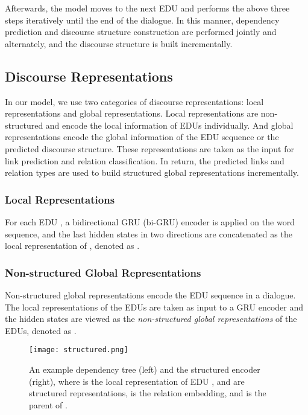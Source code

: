 \documentclass[letterpaper]{article} \usepackage{aaai19}  \usepackage{times}  \usepackage{helvet}  \usepackage{courier}  \usepackage{url}  \usepackage{graphicx}  \usepackage{amssymb}
\begin{document}
Afterwards, the model moves to the next EDU  and performs the above three steps iteratively until the end of the dialogue. In this manner, dependency prediction and discourse structure construction are performed jointly and alternately, and the discourse structure is built incrementally.

\subsection{Discourse Representations}

In our model, we use two categories of discourse representations: local representations and global representations.
Local representations are non-structured and encode the local information of EDUs individually.
And global representations encode the global information of the EDU sequence or the predicted discourse structure.
These representations are taken as the input for link prediction and relation classification. 
In return, the predicted links and relation types are used to build structured global representations incrementally.

\subsubsection{Local Representations}

For each EDU , a bidirectional GRU (bi-GRU) encoder is applied on the word sequence, and the last hidden states in two directions are concatenated as the local representation of , denoted as .

\subsubsection{Non-structured Global Representations}

Non-structured global representations encode the EDU sequence in a dialogue.
The local representations of the EDUs  are taken as input to a GRU encoder and the hidden states are viewed as the \emph{non-structured global representations} of the EDUs, denoted as .

\begin{figure}[ht]
	\centering
	\texttt{[image: structured.png]}
	\caption{An example dependency tree (left) and the structured encoder (right), where  is the local representation of EDU ,  and  are structured representations,  is the relation embedding, and  is the parent of .}
	\label{structured}
\end{figure}
\end{document}
